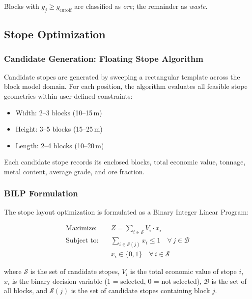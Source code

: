 \documentclass[12pt,a4paper]{article}
\begin{document}
Blocks with $g_j \geq g_{\text{cutoff}}$ are classified as \textit{ore}; the remainder as \textit{waste}.

\subsection{Stope Optimization}
\label{sec:stope-opt}

\subsubsection{Candidate Generation: Floating Stope Algorithm}

Candidate stopes are generated by sweeping a rectangular template across the block model domain. For each position, the algorithm evaluates all feasible stope geometries within user-defined constraints:

\begin{itemize}[itemsep=0.1em]
    \item Width: 2--3 blocks (10--15\,m)
    \item Height: 3--5 blocks (15--25\,m)
    \item Length: 2--4 blocks (10--20\,m)
\end{itemize}

Each candidate stope records its enclosed blocks, total economic value, tonnage, metal content, average grade, and ore fraction.

\subsubsection{BILP Formulation}

The stope layout optimization is formulated as a Binary Integer Linear Program:

\begin{align}
    \text{Maximize:} \quad & Z = \sum_{i \in \mathcal{S}} V_i \cdot x_i \label{eq:bilp-obj} \\
    \text{Subject to:} \quad & \sum_{i \in \mathcal{S}(j)} x_i \leq 1 \quad \forall\, j \in \mathcal{B} \label{eq:bilp-overlap} \\
    & x_i \in \{0, 1\} \quad \forall\, i \in \mathcal{S} \label{eq:bilp-binary}
\end{align}

where $\mathcal{S}$ is the set of candidate stopes, $V_i$ is the total economic value of stope $i$, $x_i$ is the binary decision variable (1 = selected, 0 = not selected), $\mathcal{B}$ is the set of all blocks, and $\mathcal{S}(j)$ is the set of candidate stopes containing block $j$.
\end{document}
